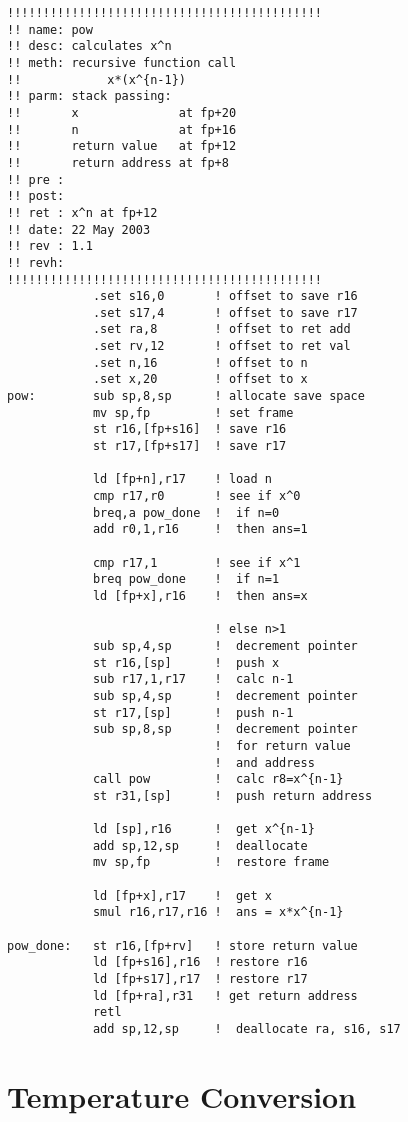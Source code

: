 \begin{verbatim}
!!!!!!!!!!!!!!!!!!!!!!!!!!!!!!!!!!!!!!!!!!!!
!! name: pow
!! desc: calculates x^n
!! meth: recursive function call
!!            x*(x^{n-1})
!! parm: stack passing:
!!       x              at fp+20
!!       n              at fp+16
!!       return value   at fp+12
!!       return address at fp+8
!! pre :
!! post:
!! ret : x^n at fp+12
!! date: 22 May 2003
!! rev : 1.1
!! revh:
!!!!!!!!!!!!!!!!!!!!!!!!!!!!!!!!!!!!!!!!!!!!
            .set s16,0       ! offset to save r16
            .set s17,4       ! offset to save r17
            .set ra,8        ! offset to ret add
            .set rv,12       ! offset to ret val
            .set n,16        ! offset to n
            .set x,20        ! offset to x
pow:        sub sp,8,sp      ! allocate save space
            mv sp,fp         ! set frame
            st r16,[fp+s16]  ! save r16
            st r17,[fp+s17]  ! save r17

            ld [fp+n],r17    ! load n
            cmp r17,r0       ! see if x^0
            breq,a pow_done  !  if n=0
            add r0,1,r16     !  then ans=1

            cmp r17,1        ! see if x^1
            breq pow_done    !  if n=1
            ld [fp+x],r16    !  then ans=x

                             ! else n>1
            sub sp,4,sp      !  decrement pointer
            st r16,[sp]      !  push x
            sub r17,1,r17    !  calc n-1
            sub sp,4,sp      !  decrement pointer
            st r17,[sp]      !  push n-1
            sub sp,8,sp      !  decrement pointer
                             !  for return value
                             !  and address
            call pow         !  calc r8=x^{n-1}
            st r31,[sp]      !  push return address

            ld [sp],r16      !  get x^{n-1}
            add sp,12,sp     !  deallocate
            mv sp,fp         !  restore frame

            ld [fp+x],r17    !  get x
            smul r16,r17,r16 !  ans = x*x^{n-1}

pow_done:   st r16,[fp+rv]   ! store return value
            ld [fp+s16],r16  ! restore r16
            ld [fp+s17],r17  ! restore r17
            ld [fp+ra],r31   ! get return address
            retl
            add sp,12,sp     !  deallocate ra, s16, s17
\end{verbatim}


\section{Temperature Conversion}

